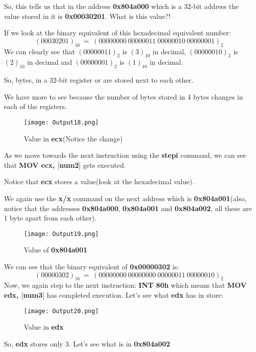 \documentclass{article}
\begin{document}
So, this tells us that in the address \textbf{0x804a000} which is a $32$-bit address the value stored in it is \textbf{0x00030201}. What is this value?!

If we look at the binary equivalent of this hexadecimal equivalent number:
$$
(00030201)_{16}\ =\ (00000000\ 00000011\ 00000010\ 00000001)_2
$$
We can clearly see that $(00000011)_2$ is $(3)_{10}$ in decimal, $(00000010)_2$ is $(2)_{10}$ in decimal and $(00000001)_2$ is $(1)_{10}$ in decimal.

So, bytes, in a $32$-bit register or are stored next to each other.

We have more to see because the number of bytes stored in 4 bytes changes in each of the registers.

\begin{figure}[h]
\centering
\texttt{[image: Output18.png]}
\caption{Value in \textbf{ecx}(Notice the change)}
\label{fig:valECX}
\end{figure}

As we move towards the next instruction using the \textbf{stepi} command, we can see that \textbf{MOV ecx, $\lbrack$num2$\rbrack$} gets executed.

\vspace{10pt}
Notice that \textbf{ecx} stores a value(look at the hexadecimal value).

We again use the \textbf{x/x} command on the next address which is \textbf{0x804a001}(also, notice that the addresses \textbf{0x804a000}, \textbf{0x804a001} and \textbf{0x804a002}, all these are 1 byte apart from each other).
\begin{figure}[h]
\centering
\texttt{[image: Output19.png]}
\caption{Value of \textbf{0x804a001}}
\label{fig:figure5}
\end{figure}

We can see that the binary equivalent of \textbf{0x00000302} is:
$$
(00000302)_{16}\ =\ (00000000\ 00000000\ 00000011\ 00000010)_2
$$
\newpage
Now, we again step to the next instruction: \textbf{INT 80h} which means that \textbf{MOV edx, $\lbrack$num3$\rbrack$} has completed execution.
Let's see what \textbf{edx} has in store:
\begin{figure}[h]
\centering
\texttt{[image: Output20.png]}
\caption{Value in \textbf{edx}}
\end{figure}

So, \textbf{edx} stores only $3$.
Let's see what is in \textbf{0x804a002}
\end{document}
